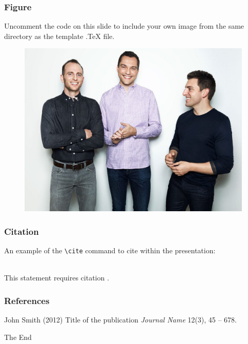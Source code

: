 \documentclass{beamer}
\begin{document}

\begin{frame}
\frametitle{Figure}
Uncomment the code on this slide to include your own image from the same directory as the template .TeX file.
\begin{figure}
\includegraphics[width=0.6\linewidth]{founders}
\end{figure}
\end{frame}

\begin{frame}[fragile] %
\frametitle{Citation}
An example of the \verb|\cite| command to cite within the presentation:\\~

This statement requires citation \cite{p1}.
\end{frame}


\begin{frame}
\frametitle{References}
\footnotesize{
\begin{thebibliography}{99} %
 John Smith (2012)
\newblock Title of the publication
\newblock \emph{Journal Name} 12(3), 45 -- 678.
\end{thebibliography}
}
\end{frame}


\begin{frame}
\Huge{\centerline{The End}}
\end{frame}

\end{document}

